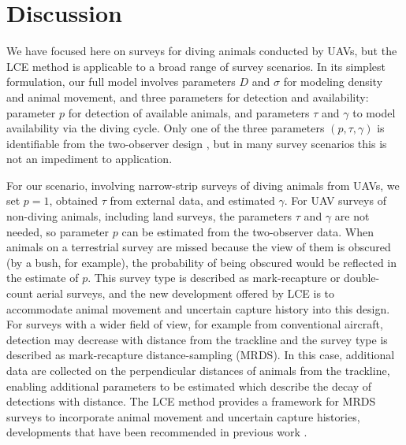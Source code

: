 \documentclass[useAMS, usenatbib, referee]{biom}\usepackage[]{graphicx}\usepackage[]{color}
\begin{document}
\section{Discussion\label{sec:discussion}}


We have focused here on surveys for diving animals conducted by UAVs, but the LCE method is applicable to a broad range of survey scenarios. In its simplest formulation, our full model involves parameters $D$ and $\sigma$ for modeling density and animal movement, and three parameters for detection and availability: parameter $p$ for detection of available animals, and parameters $\tau$ and $\gamma$ to model availability via the diving cycle. Only one of the three parameters $(p, \tau, \gamma)$ is identifiable from the two-observer design \citep{Stevenson+al:19}, but in many survey scenarios this is not an impediment to application.

For our scenario, involving narrow-strip surveys of diving animals from UAVs, we set $p=1$, obtained $\tau$ from external data, and estimated $\gamma$. For UAV surveys of non-diving animals, including land surveys, the parameters $\tau$ and $\gamma$ are not needed, so parameter $p$ can be estimated from the two-observer data. When animals on a terrestrial survey are missed because the view of them is obscured (by a bush, for example), the probability of being obscured would be reflected in the estimate of $p$. This survey type is described as mark-recapture or double-count aerial surveys, and the new development offered by LCE is to accommodate animal movement and uncertain capture history into this design. For surveys with a wider field of view, for example from conventional aircraft, detection may decrease with distance from the trackline and the survey type is described as mark-recapture distance-sampling (MRDS). In this case, additional data are collected on the perpendicular distances of animals from the trackline, enabling additional parameters to be estimated which describe the decay of detections with distance. The LCE method provides a framework for MRDS surveys to incorporate animal movement and uncertain capture histories, developments that have been recommended in previous work \citep{Burt+al:14}.
\end{document}

